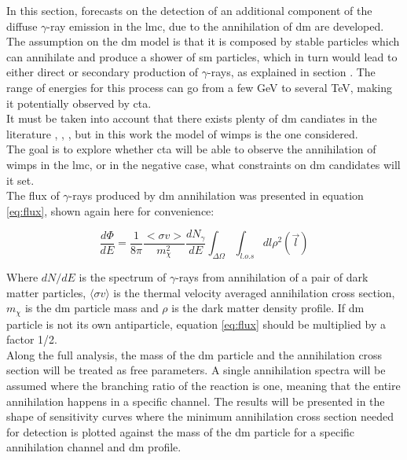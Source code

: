 \documentclass[main.tex]{subfiles}
\begin{document}
In this section, forecasts on the detection of an additional component of the diffuse $\gamma$-ray emission in the \gls{lmc}, due to the annihilation of \gls{dm} are developed. The assumption on the \gls{dm} model is that it is composed by stable particles which can annihilate and produce a shower of \gls{sm} particles, which in turn would lead to either direct or secondary production of $\gamma$-rays, as explained in section \label{sec:DM}. The range of energies for this process can go from a few GeV to several TeV, making it potentially observed by \gls{cta}.\\
It must be taken into account that there exists plenty of \gls{dm} candiates in the literature \cite{2004DMcandidates}, \cite{2005DMcandidates}, \cite{2009DMcandidates}, but in this work the model of \glspl{wimp} is the one considered.\\
The goal is to explore whether \gls{cta} will be able to observe the annihilation of \glspl{wimp} in the \gls{lmc}, or in the negative case, what constraints on \gls{dm} candidates will it set.\\
The flux of $\gamma$-rays produced by \gls{dm} annihilation was presented in equation \ref{eq:flux}, shown again here for convenience:

\begin{equation}
    \frac{d \Phi}{dE}=\frac{1}{8 \pi} \frac{<\sigma v>}{m_{\chi}^2} \frac{d N_{\gamma}}{dE} \int_{\Delta\Omega}\int_{l.o.s} dl \rho^2(\vec{l})
\label{eq:flux}
\end{equation}

Where $dN/dE$ is the spectrum of $\gamma$-rays from annihilation of a pair of dark matter particles, $\langle\sigma v\rangle$ is the thermal velocity averaged annihilation cross section, $m_\chi$ is the \gls{dm} particle mass and $\rho$ is the dark matter density profile. If \gls{dm} particle is not its own antiparticle, equation \ref{eq:flux} should be multiplied by a factor 1/2. \\
Along the full analysis, the mass of the \gls{dm} particle and the annihilation cross section will be treated as free parameters. A single annihilation spectra will be assumed where the branching ratio of the reaction is one, meaning that the entire annihilation happens in a specific channel. The results will be presented in the shape of sensitivity curves where the minimum annihilation cross section needed for detection is plotted against the mass of the \gls{dm} particle for a specific annihilation channel and \gls{dm} profile.
\end{document}

